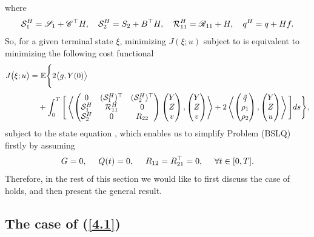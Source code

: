 \documentclass[11pt,times,twoside]{article}
\def\dbE{\mathbb{E}} \def\sE{\mathscr{E}} \def\fE{\mathfrak{E}} \def\cE{{\cal E}} \def\BE{{\bf E}} \def\Be{{\bf e}}
\begin{document}
%
where
%
$$
{\cal S}_{1}^{H}=\mathscr{S}_{1}+\mathscr{C}^{\top} H, \quad {\cal S}_{2}^{H}=S_{2}+B^{\top} H, \quad {\cal R}_{11}^{H}=\mathscr{R}_{11}+H,\quad  q^H= q +Hf.
$$
%
So, for a given terminal state $\xi$, minimizing $J(\xi;u)$ subject to  is equivalent to minimizing the following cost functional
%
%
\begin{align*}
\ds J\big(\xi;u\big)=&~\dbE\Bigg\{2\big\lan g,Y(0)\big\ran\\
%
\ns\ds & +\int_0^T\Bigg[
\llan\begin{pmatrix}0&(\cS^H_1)^\top&(\cS^H_2)^\top\\ \cS^H_1&\cR^H_{11}&0
\\ \cS^H_2&0&R_{22} \end{pmatrix}
\begin{pmatrix}Y\\Z\\v\end{pmatrix},
\begin{pmatrix}Y\\Z\\v\end{pmatrix}\rran
%
+2\llan\begin{pmatrix}\tilde{q}\\ \rho_1\\ \rho_2 \end{pmatrix},
   \begin{pmatrix}Y\\Z\\u\end{pmatrix}\rran\Bigg] ds\Bigg\}, \nonumber
%
\end{align*}
%
subject to the state equation ,  which enables us to simplify Problem (BSLQ) firstly by assuming
%
\begin{align}\label{4.1}
  G=0,\quad~ Q(t)=0,\quad~ R_{12}=R^\top_{21}=0,\quad~\forall t\in[0,T].
\end{align}
%
Therefore, in the rest of this section we would like to first discuss the case of  holds, and then present the general result.
%
%
\subsection{The case of (\ref{4.1})}\label{subsec4.1}
\end{document}
